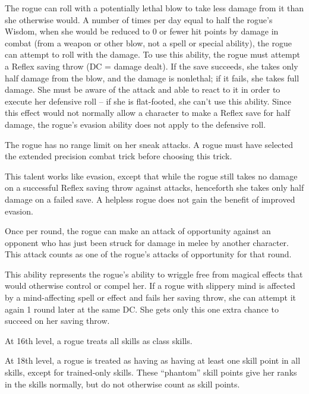   The rogue can roll with a potentially lethal blow to take less damage from it than she otherwise would.  A number of times per day equal to half the rogue's Wisdom, when she would be reduced to 0 or fewer hit points by damage in combat (from a weapon or other blow, not a spell or special ability), the rogue can attempt to roll with the damage. To use this ability, the rogue must attempt a Reflex saving throw (DC = damage dealt). If the save succeeds, she takes only half damage from the blow, and the damage is nonlethal; if it fails, she takes full damage. She must be aware of the attack and able to react to it in order to execute her defensive roll -- if she is flat-footed, she can't use this ability. Since this effect would not normally allow a character to make a Reflex save for half damage, the rogue's evasion ability does not apply to the defensive roll.

 The rogue has no range limit on her sneak attacks. A rogue must have selected the extended precision combat trick before choosing this trick.

 This talent works like evasion, except that while the rogue still takes no damage on a successful Reflex saving throw against attacks, henceforth she takes only half damage on a failed save. A helpless rogue does not gain the benefit of improved evasion.

  Once per round, the rogue can make an attack of opportunity against an opponent who has just been struck for damage in melee by another character. This attack counts as one of the rogue's attacks of opportunity for that round.

  This ability represents the rogue's ability to wriggle free from magical effects that would otherwise control or compel her. If a rogue with slippery mind is affected by a mind-affecting spell or effect and fails her saving throw, she can attempt it again 1 round later at the same DC. She gets only this one extra chance to succeed on her saving throw.

 At 16th level, a rogue treats all skills as class skills.

 At 18th level, a rogue is treated as having as having at least one skill point in all skills, except for trained-only skills. These ``phantom'' skill points give her ranks in the skills normally, but do not otherwise count as skill points.


